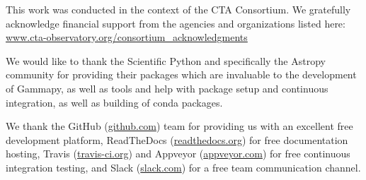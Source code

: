 \documentclass{PoS}
\newcommand{\urlCtaAck}{\href{http://www.cta-observatory.org/consortium_acknowledgments}{www.cta-observatory.org/consortium\_acknowledgments}}
\newcommand{\urlGithub}{\href{https://github.com}{github.com}}
\newcommand{\urlRtd}{\href{https://readthedocs.org}{readthedocs.org}}
\newcommand{\urlTravis}{\href{https://travis-ci.org}{travis-ci.org}}
\newcommand{\urlAppveyor}{\href{https://appveyor.com}{appveyor.com}}
\newcommand{\urlSlack}{\href{https://slack.com}{slack.com}}
\begin{document}
This work was conducted in the context of the CTA Consortium. We gratefully
acknowledge financial support from the agencies and organizations listed here:\\
\urlCtaAck

We would like to thank the Scientific Python and specifically the Astropy
community for providing their packages which are invaluable to the development
of Gammapy, as well as tools and help with package setup and continuous
integration, as well as building of conda packages.

We thank the GitHub (\urlGithub) team for providing us with an excellent free
development platform, ReadTheDocs (\urlRtd) for free documentation hosting,
Travis (\urlTravis) and Appveyor (\urlAppveyor) for free continuous integration
testing, and Slack (\urlSlack) for a free team communication channel.



\end{document}
